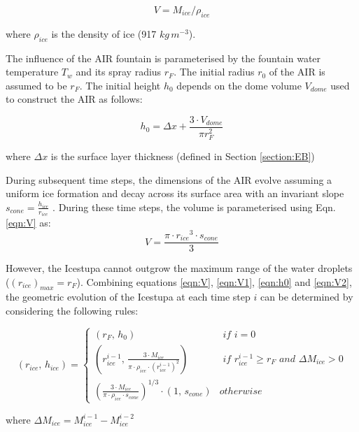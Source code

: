 \documentclass[utf8]{frontiersSCNS} %
\begin{document}
\begin{equation} V = M_{ice} /\rho_{ice} \label{eqn:V1} \end{equation} 

where $\rho_{ice}$ is the density of ice (917 $kg\, m^{-3}$). 


The influence of the AIR fountain is parameterised by the fountain water temperature $T_{w}$ and its spray radius $r_F$.
The initial radius $r_0$ of the AIR is assumed to be $r_F$. The initial height $h_0$ depends on the dome volume
$V_{dome}$ used to construct the AIR as follows:

\begin{equation} 
    h_{0} =  \Delta x + \frac{3 \cdot V_{dome}}{\pi r_F^2 } 
\label{eqn:h0}
  \end{equation}

where $\Delta x$ is the surface layer thickness (defined in Section \ref{section:EB})

During subsequent time steps, the dimensions of the AIR evolve assuming a uniform ice formation and decay across
its surface area with an invariant slope $s_{cone} = \frac{h_{ice}}{r_{ice}}$ .  During
these time steps, the volume is parameterised using Eqn. \ref{eqn:V} as:\begin{equation} V = \frac{\pi \cdot {r_{ice}}^3
    \cdot s_{cone}}{3} \label{eqn:V2} \end{equation} 


However, the Icestupa cannot outgrow the maximum range of the water droplets ($(r_{ice})_{max} = r_{F}$). Combining
equations \ref{eqn:V},  \ref{eqn:V1}, \ref{eqn:h0} and \ref{eqn:V2}, the geometric evolution of the Icestupa at each time step $i$ can
be determined by considering the following rules:

\begin{equation} (r_{ice},\, h_{ice}) = \left\{ \begin{array}{ll} (r_F ,\, h_0) & \textit{ if } i=0\\
    (r_{ice}^{i-1},\, \frac{3 \cdot M_{ice}}{\pi \cdot \rho_{ice} \cdot {(r_{ice}^{i-1})}^2}) & \textit{ if }
    r_{ice}^{i-1} \geq r_{F} \textit{ and } \Delta M_{ice} > 0 \\ (\frac{3 \cdot M_{ice}}{\pi \cdot \rho_{ice} \cdot s_{cone}})^{1/3} \cdot (1,\,  s_{cone}) &
otherwise \end{array} \right.  \label{eqn:A2} \end{equation}

where $\Delta M_{ice} = M_{ice}^{i-1} - M_{ice}^{i-2}$
\end{document}
